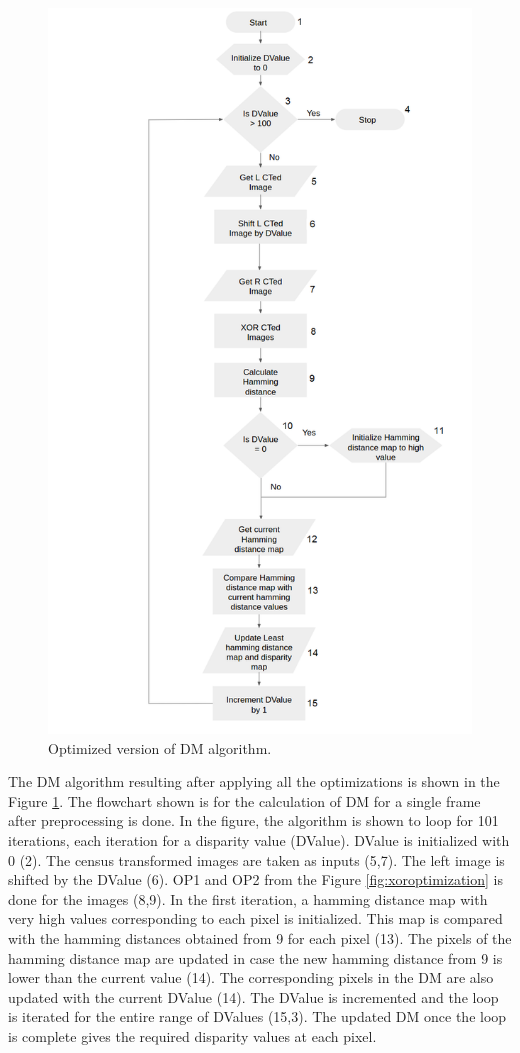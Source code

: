 \begin{figure}
    \center
    \includegraphics[width=.8\linewidth]{figures/shdalgorithm}
    \caption{Optimized version of DM algorithm.}
    \label{fig:shdalgorithm}
\end{figure}

The DM algorithm resulting after applying all the optimizations is shown in the Figure \ref{fig:shdalgorithm}. The flowchart shown is for the calculation of DM for a single frame after preprocessing is done. In the figure, the algorithm is shown to loop for 101 iterations, each iteration for a disparity value (DValue). DValue is initialized with 0 (2). The census transformed images are taken as inputs (5,7). The left image is shifted by the DValue (6). OP1 and OP2 from the Figure \ref{fig:xoroptimization} is done for the images (8,9). In the first iteration, a hamming distance map with very high values corresponding to each pixel is initialized. This map is compared with the hamming distances obtained from 9 for each pixel (13). The pixels of the hamming distance map are updated in case the new hamming distance from 9 is lower than the current value (14). The corresponding pixels in the DM are also updated with the current DValue (14). The DValue is incremented and the loop is iterated for the entire range of DValues (15,3). The updated DM once the loop is complete gives the required disparity values at each pixel.

